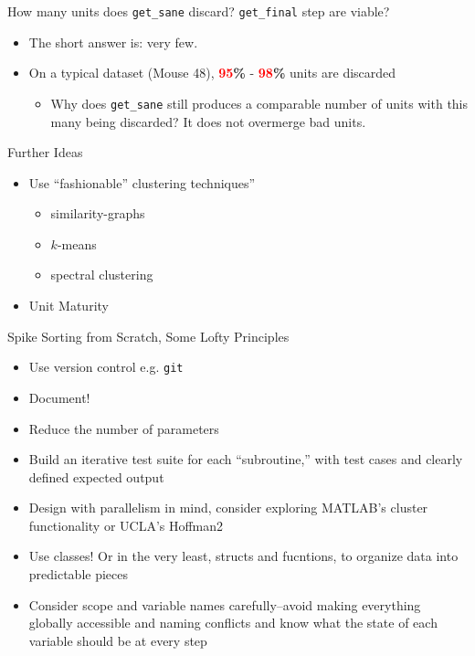 \documentclass{beamer}
\begin{document}
    \begin{frame}{How many units does \texttt{get\_sane} discard?}
\texttt{get\_final} step are viable?
        \pause
        \begin{itemize}
        \item The short answer is: very few.
        \pause
        \item On a typical dataset (Mouse 48),
\textbf{\textcolor{red}{95}\%} - \textbf{\textcolor{red}{98}\%} units are
discarded
        \begin{itemize}
            \item Why does \texttt{get\_sane} still produces a comparable number
of units with this many being discarded? It does not overmerge bad units.
        \end{itemize} 
        \end{itemize}
    \end{frame}
 

    \begin{frame}{Further Ideas}
    \begin{itemize}
        \pause
        \item Use ``fashionable'' clustering techniques''
        \begin{itemize}
            \item similarity-graphs
            \item \ensuremath{k}-means
            \item spectral clustering
        \end{itemize}
        \pause
        \item Unit Maturity
    \end{itemize}
    \end{frame}
    
       
    \begin{frame}{Spike Sorting from Scratch, Some Lofty Principles}
        \begin{itemize}
            \pause 
            \item Use version control e.g. \texttt{git}
            \pause
            \item Document!
            \pause
            \item Reduce the number of parameters
            \pause
            \item Build an iterative test suite for each ``subroutine,'' with
test cases and clearly defined expected output
            \pause
            \item Design with parallelism in mind, consider exploring MATLAB's
cluster functionality or UCLA's Hoffman2
            \pause
            \item  Use classes! Or in the very least, structs and fucntions, to organize data
into predictable pieces
            \pause
            \item Consider scope and variable names carefully--avoid making
everything globally accessible and naming conflicts and know what the state of
each variable should be at every step
        \end{itemize}
    \end{frame}
\end{document}
